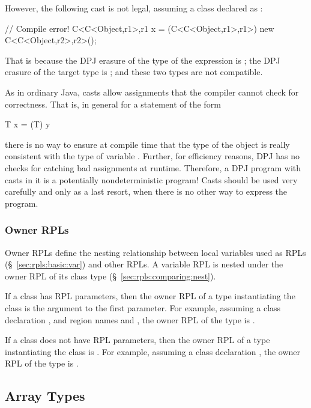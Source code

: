 However, the following cast is not legal, assuming a class declared as
:
%
\begin{dpjlisting}
// Compile error!
C<C<Object,r1>,r1 x = 
  (C<C<Object,r1>,r1>) new C<C<Object,r2>,r2>();
\end{dpjlisting}
%
That is because the DPJ erasure of the type of the 
expression is ; the DPJ erasure of the target type
is ; and these two types are not compatible.

As in ordinary Java, casts allow assignments that the compiler cannot
check for correctness.  That is, in general for a statement of the
form
%
\begin{dpjlisting}
T x = (T) y
\end{dpjlisting}
%
there is no way to ensure at compile time that the type of the object
 is really consistent with the type  of variable
.  Further, for efficiency reasons, DPJ has no checks for
catching bad assignments at runtime.  Therefore, a DPJ program with
casts in it is a potentially nondeterministic program!  Casts should
be used very carefully and only as a last resort, when there is no
other way to express the program.

\subsubsection{Owner RPLs%
\label{sec:types:class:owner-rpl}}

Owner RPLs define the nesting relationship between  local
variables used as RPLs (\S~\ref{sec:rpls:basic:var}) and other RPLs.
A variable RPL is nested under the owner RPL of its class type
(\S~\ref{sec:rpls:comparing:nest}).

If a class has RPL parameters, then the owner RPL of a type
instantiating the class is the argument to the first parameter.  For
example, assuming a class declaration , and
region names  and , the owner RPL of the type
 is .

If a class does not have RPL parameters, then the owner RPL of a type
instantiating the class is .  For example, assuming a class
declaration , the owner RPL of the type
 is .
%

\subsection{Array Types%
\label{sec:types:array}}


